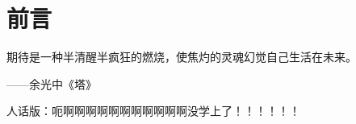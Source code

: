 \chapter*{前言}
期待是一种半清醒半疯狂的燃烧，使焦灼的灵魂幻觉自己生活在未来。\begin{flushright}
    ——余光中《塔》
\end{flushright}

人话版：呃啊啊啊啊啊啊啊啊啊啊啊没学上了！！！！！！